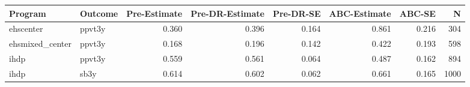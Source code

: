 \begin{table}[ht]
\centering
\begin{tabular}{llrrrrrr}
  \hline
Program & Outcome & Pre-Estimate & Pre-DR-Estimate & Pre-DR-SE & ABC-Estimate & ABC-SE & N \\ 
  \hline
ehscenter & ppvt3y & 0.360 & 0.396 & 0.164 & 0.861 & 0.216 & 304 \\ 
  ehsmixed\_center & ppvt3y & 0.168 & 0.196 & 0.142 & 0.422 & 0.193 & 598 \\ 
  ihdp & ppvt3y & 0.559 & 0.561 & 0.064 & 0.487 & 0.162 & 894 \\ 
  ihdp & sb3y & 0.614 & 0.602 & 0.062 & 0.661 & 0.165 & 1000 \\ 
   \hline
\end{tabular}
\end{table}
